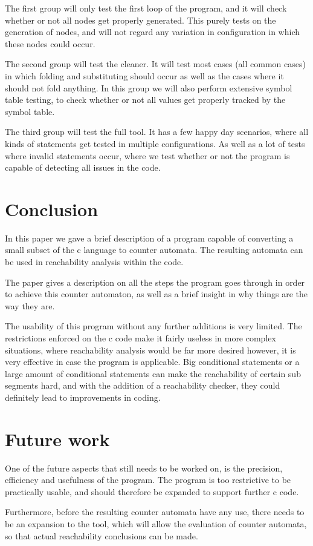 \documentclass[12pt]{article}
\begin{document}
The first group will only test the first loop of the program, and it will check whether or not all nodes get properly generated. This purely tests on the generation of nodes, and will not regard any variation in configuration in which these nodes could occur.

The second group will test the cleaner. It will test most cases (all common cases) in which folding and substituting should occur as well as the cases where it should not fold anything. In this group we will also perform extensive symbol table testing, to check whether or not all values get properly tracked by the symbol table.

The third group will test the full tool. It has a few happy day scenarios, where all kinds of statements get tested in multiple configurations. As well as a lot of tests where invalid statements occur, where we test whether or not the program is capable of detecting all issues in the code.

\section{Conclusion}
In this paper we gave a brief description of a program capable of converting a small subset of the c language to counter automata. The resulting automata can be used in reachability analysis within the code. 

The paper gives a description on all the steps the program goes through in order to achieve this counter automaton, as well as a brief insight in why things are the way they are.

The usability of this program without any further additions is very limited. The restrictions enforced on the c code make it fairly useless in more complex situations, where reachability analysis would be far more desired however, it is very effective in case the program is applicable. Big conditional statements or a large amount of conditional statements can make the reachability of certain sub segments hard, and with the addition of a reachability checker, they could definitely lead to improvements in coding.

\section{Future work}
One of the future aspects that still needs to be worked on, is the precision, efficiency and usefulness of the program. The program is too restrictive to be practically usable, and should therefore be expanded to support further c code.

Furthermore, before the resulting counter automata have any use, there needs to be an expansion to the tool, which will allow the evaluation of counter automata, so that actual reachability conclusions can be made.
\printbibliography
\end{document}

